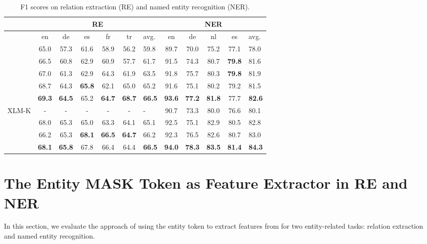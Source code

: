 \documentclass[11pt]{article}
\begin{document}
 \begin{table*}[ht]
    \small
  \centering
\begin{tabular}{l|cccccl|ccccl} \toprule
                & \multicolumn{6}{c|}{RE} & \multicolumn{5}{c}{NER}         \\ \midrule
                & en   & de   & es   & fr   & tr   & avg. & en   & de   & nl   & es   & avg. \\ \midrule
\mbert{}       & 65.0 & 57.3 & 61.6 & 58.9 & 56.2 & 59.8 & 89.7 & 70.0 & 75.2 & 77.1 & 78.0 \\
\xlmr{}\ba{}        & 66.5 & 60.8 & 62.9 & 60.9 & 57.7 & 61.7 & 91.5 & 74.3 & 80.7 & {\bf 79.8} & 81.6 \\
\extraTraining{} & 67.0 & 61.3 & 62.9 & 64.3 & 61.9 & 63.5 & 91.8 & 75.7 & 80.3 & {\bf 79.8} & 81.9 \\
\mlukeW{}\ba{}      & 68.7 & 64.3 & {\bf 65.8} & 62.1 & 65.0 & 65.2 & 91.6 & 75.1 & 80.2 & 79.2 & 81.5 \\
\mlukeE{}\ba{}      & {\bf 69.3} & {\bf 64.5} & 65.2 & {\bf 64.7} & {\bf 68.7} & {\bf 66.5} & {\bf 93.6} & {\bf 77.2} & {\bf 81.8} & 77.7 & {\bf 82.6} \\
\midrule
XLM-K \citep{XLM-K-2021-arxiv} & - & - & - & - & - & - & 90.7 & 73.3 & 80.0 & 76.6 & 80.1 \\
\midrule
\xlmr{}\la{}        & 68.0 & 65.3 & 65.0 & 63.3 & 64.1 & 65.1 & 92.5 & 75.1 & 82.9 & 80.5 & 82.8 \\
\mlukeW{}\la{}      & 66.2 & 65.3 & {\bf 68.1} & {\bf 66.5} & {\bf 64.7} & 66.2 & 92.3 & 76.5 & 82.6 & 80.7 & 83.0 \\
\mlukeE{}\la{}      & {\bf 68.1} & {\bf 65.8} & 67.8 & 66.4 & 64.4 & {\bf 66.5} & {\bf 94.0} & {\bf 78.3} & {\bf 83.5} & {\bf 81.4} & {\bf 84.3} \\  
\bottomrule
\end{tabular}
\caption{F1 scores on relation extraction (RE) and named entity recognition (NER).}
\label{table:results-entity}
\vspace{-4mm}
\end{table*}

\section{The Entity MASK Token as Feature Extractor in RE and  NER}
\label{sec:experiment-rc-ner}
In this section, we evaluate the approach of using the entity \mask{} token to extract features from \mlukeE{} for two entity-related tasks: relation extraction and named entity recognition.
\end{document}

